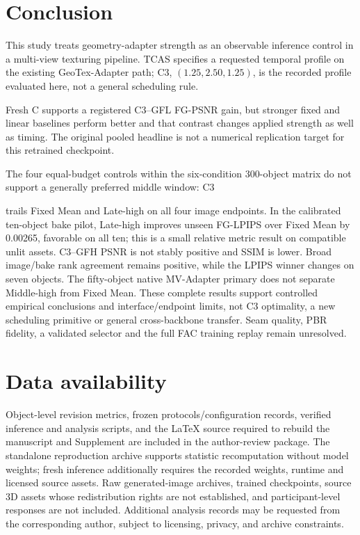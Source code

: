 \documentclass[times,twocolumn,final]{elsarticle}
\providecommand{\DIFadd}[1]{{\protect\color{blue} \sf #1}} %
\providecommand{\DIFaddbegin}{} %
\providecommand{\DIFaddend}{} %
\begin{document}
\section{Conclusion}
\label{sec:conclusion}

  \DIFaddbegin \DIFadd{This study treats geometry-adapter strength as an observable inference control in a }\DIFaddend multi-view   \DIFaddbegin \DIFadd{texturing pipeline. TCAS specifies a requested temporal profile on the existing GeoTex-Adapter path; C3, $(1.25,2.50,1.25)$, is the recorded profile evaluated here, not a general scheduling rule}\DIFaddend .

  \DIFaddbegin \DIFadd{Fresh C supports a registered C3--GFL FG-PSNR gain, but stronger fixed and linear baselines perform better and that contrast changes applied strength as well as timing. The original pooled headline is not a numerical replication target for this retrained checkpoint.
}

\DIFadd{The four equal-budget controls within the six-condition }\DIFaddend 300-object   \DIFaddbegin \DIFadd{matrix do not support a generally preferred middle window: }\DIFaddend C3  

 \DIFaddbegin \DIFadd{trails Fixed Mean and Late-high on all four image endpoints. In the calibrated ten-object bake pilot, Late-high improves unseen FG-LPIPS over Fixed Mean by 0.00265, favorable on all ten; this is a small relative metric result on compatible unlit assets. C3--GFH PSNR is not stably positive and SSIM is lower. Broad image/bake rank agreement remains positive, while the LPIPS winner changes on seven objects. The fifty-object native MV-Adapter primary does not separate Middle-high from Fixed Mean. These complete results support controlled empirical conclusions and interface/endpoint limits, not C3 optimality, a new scheduling primitive or general cross-backbone transfer. Seam quality, PBR fidelity, a validated selector and }\DIFaddend the   \DIFaddbegin \DIFadd{full FAC training replay remain unresolved.
}\DIFaddend 

\section*{Data availability}

  \DIFaddbegin \DIFadd{Object-level revision metrics, frozen protocols/configuration records, verified inference and analysis scripts, and the LaTeX source required to rebuild the manuscript and Supplement are included in the author-review package. The standalone reproduction archive supports statistic recomputation without model weights; fresh inference additionally requires the recorded weights, runtime and licensed source assets. Raw generated-image archives, trained checkpoints, source 3D assets whose redistribution rights are not established, and participant-level responses are not included. Additional analysis records may be requested from the corresponding author, subject to licensing, privacy, and archive constraints.
}
\end{document}
